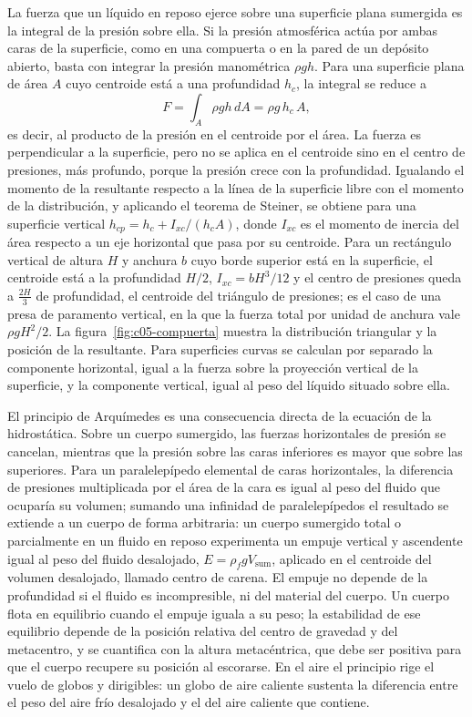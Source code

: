 \documentclass[10pt,openany]{book}
\begin{document}
La fuerza que un líquido en reposo ejerce sobre una superficie plana sumergida es la integral de la presión sobre ella. Si la presión atmosférica actúa por ambas caras de la superficie, como en una compuerta o en la pared de un depósito abierto, basta con integrar la presión manométrica \(\rho g h\). Para una superficie plana de área \(A\) cuyo centroide está a una profundidad \(h_c\), la integral se reduce a
\begin{equation}
F = \int_A \rho g h\,dA = \rho g\,h_c\,A, \label{eq:c05-fuerza}
\end{equation}
es decir, al producto de la presión en el centroide por el área. La fuerza es perpendicular a la superficie, pero no se aplica en el centroide sino en el centro de presiones, más profundo, porque la presión crece con la profundidad. Igualando el momento de la resultante respecto a la línea de la superficie libre con el momento de la distribución, y aplicando el teorema de Steiner, se obtiene para una superficie vertical \(h_{cp} = h_c + I_{xc}/(h_c A)\), donde \(I_{xc}\) es el momento de inercia del área respecto a un eje horizontal que pasa por su centroide. Para un rectángulo vertical de altura \(H\) y anchura \(b\) cuyo borde superior está en la superficie, el centroide está a la profundidad \(H/2\), \(I_{xc} = bH^{3}/12\) y el centro de presiones queda a \(\tfrac{2H}{3}\) de profundidad, el centroide del triángulo de presiones; es el caso de una presa de paramento vertical, en la que la fuerza total por unidad de anchura vale \(\rho g H^{2}/2\). La figura~\ref{fig:c05-compuerta} muestra la distribución triangular y la posición de la resultante. Para superficies curvas se calculan por separado la componente horizontal, igual a la fuerza sobre la proyección vertical de la superficie, y la componente vertical, igual al peso del líquido situado sobre ella.

El principio de Arquímedes es una consecuencia directa de la ecuación de la hidrostática. Sobre un cuerpo sumergido, las fuerzas horizontales de presión se cancelan, mientras que la presión sobre las caras inferiores es mayor que sobre las superiores. Para un paralelepípedo elemental de caras horizontales, la diferencia de presiones multiplicada por el área de la cara es igual al peso del fluido que ocuparía su volumen; sumando una infinidad de paralelepípedos el resultado se extiende a un cuerpo de forma arbitraria: un cuerpo sumergido total o parcialmente en un fluido en reposo experimenta un empuje vertical y ascendente igual al peso del fluido desalojado, \(E = \rho_f g V_{\mathrm{sum}}\), aplicado en el centroide del volumen desalojado, llamado centro de carena. El empuje no depende de la profundidad si el fluido es incompresible, ni del material del cuerpo. Un cuerpo flota en equilibrio cuando el empuje iguala a su peso; la estabilidad de ese equilibrio depende de la posición relativa del centro de gravedad y del metacentro, y se cuantifica con la altura metacéntrica, que debe ser positiva para que el cuerpo recupere su posición al escorarse. En el aire el principio rige el vuelo de globos y dirigibles: un globo de aire caliente sustenta la diferencia entre el peso del aire frío desalojado y el del aire caliente que contiene.
\end{document}
